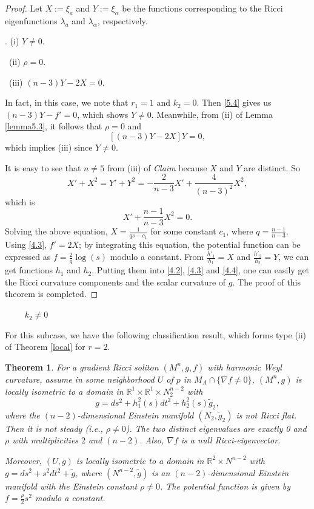 \documentclass{amsart}
\newtheorem{theorem}{Theorem}[section]
\theoremstyle{definition}
\theoremstyle{remark}
\numberwithin{equation}{section}
\begin{document}
\begin{proof} 
	Let $X:=\xi_a$ and $Y:=\xi_\alpha$ be the functions corresponding to the Ricci eigenfunctions 
	$\lambda_a$ and $\lambda_\alpha$, respectively.
	
.
	{\rm (i)} $Y\neq0$.
	
	\smallskip
\quad\quad \ {\rm (ii)} $\rho=0$.
	
	\smallskip
\quad\quad \ {\rm (iii)} $(n-3)Y-2X=0$. 
	
	In fact, in this case, we note that $r_1=1$ and $k_2=0$. Then \eqref {5.4} gives us
	$(n-3)Y-f'=0$, which shows $Y\neq0$.
Meanwhile, from (ii) of Lemma \ref{lemma5.3}, it follows that
	$\rho=0$ and 
\[
	[(n-3)Y-2X]Y= 0,
\]
	which implies (iii) since  $Y\neq0$.

	It is easy to see that $n\neq5$ from (iii) of {\it Claim} because $X$ and $Y$ are distinct.
	So
	\[
	X'+X^2=Y'+Y^2= -\frac{2}{n-3}X' +\frac{4}{(n-3)^2}X^2,
	\]
	which is 
	\[
	X'+\frac{n-1}{n-3}X^2=0. 
	\]
	Solving the above equation, 
	$X=\frac{1}{qs-c_1}$ for some constant $c_1$, where $q=\frac{n-1}{n-3}$.
	Using \eqref{4.3}, $f'=2X$; by integrating this equation,
	the potential function can be expressed as $f=\frac{2}{q} \log (s)$ modulo a constant.
	From $\frac{h'_1}{h_1}=X$ and $\frac{h'_2}{h_2}=Y$, we can get functions $h_1$ and $h_2$.
	Putting them into \eqref{4.2}, \eqref{4.3} and \eqref{4.4}, one can easily get the Ricci curvature components and the scalar curvature of $g$.  
	The proof of this theorem is completed. 	
\end{proof}


  ~~~~ $k_2\neq0$ 

For this subcase, we have the following classification result,
which forms type {\rm (ii)} of Theorem \ref{local} for $r=2$.
	
\begin{theorem} \label{twoone2}
		For a gradient Ricci soliton $\left(M^n, g, f \right) $ with harmonic Weyl curvature,
	assume in some neighborhood $U$ of $p$ in $M_A \cap \{ \nabla f \neq 0  \}$, 
	$(M^n,g)$ is locally isometric to a domain in 
	$\mathbb{R}^{1}\times \mathbb{R}^{1} \times N^{n-2}_2$
	with
	\[
	g= ds^2 + h^2_1(s)dt^2+h^2_2(s) \tilde{g}_{2}, 
	\]
	where the $(n-2)$-dimensional Einstein manifold $(N_2, \tilde{g}_{2})$ is not Ricci flat.
	Then it is not steady (i.e., $\rho\neq0$).  The two distinct eigenvalues are exactly  0 and $\rho$
	with multiplicities $2$ and $(n-2)$. Also, $\nabla f$ is a null Ricci-eigenvector.
	
	Moreover, $(U,g)$ is locally isometric to a domain in 
	$\mathbb{R}^{2}\times N^{n-2}$
	with $g= ds^2 + s^2dt^2+\tilde{g} $,
	where $\left(N^{n-2}, \tilde{g}\right)$ 
	is an $(n-2)$-dimensional Einstein manifold
	with the Einstein constant $\rho\neq 0$.
	The potential function is given by $f = \frac{\rho}{2}s^2$ modulo a constant.
\end{theorem}
\end{document}
